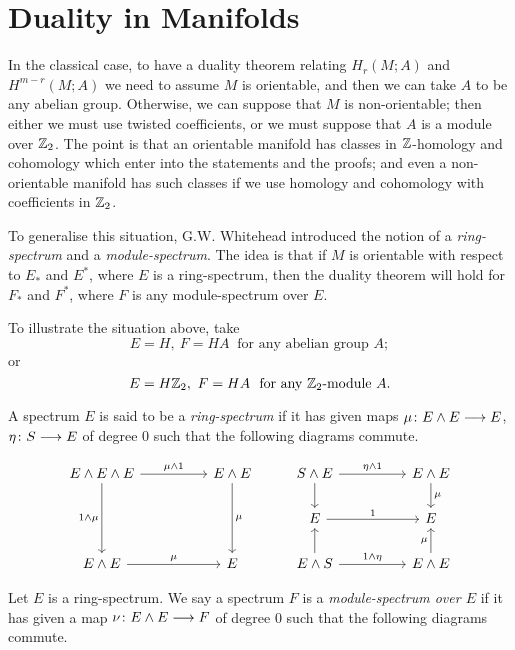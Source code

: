 \documentclass[../main]{subfiles}
\begin{document}
\chapter{Duality in Manifolds}
\label{sec:p3c10}
In the classical case, to have a duality theorem relating $H_r(M;A)$ and $H^{m-r}(M;A)$ we need to assume $M$ is orientable, and then we can take $A$ to be any abelian group. Otherwise, we can suppose that $M$ is non-orientable; then either we must use twisted coefficients, or we must suppose that $A$ is a module over $\mathbb{Z}_2$. The point is that an orientable manifold has classes in $\mathbb{Z}$-homology and cohomology which enter into the statements and the proofs; and even a non-orientable manifold has such classes if we use homology and cohomology with coefficients in $\mathbb{Z}_2$. 

To generalise this situation, G.W. Whitehead introduced the notion of a \emph{ring-spectrum} and a \emph{module-spectrum}. The idea is that if $M$ is orientable with respect to $E_*$ and $E^*$, where $E$ is a ring-spectrum, then the duality theorem will hold for $F_*$ and $F^*$, where $F$ is any module-spectrum over $E$.
\begin{examples}
To illustrate the situation above, take
\[E=H, \ F=HA \ \text{ for any abelian group } A;\]
or
\[E = H\mathbb{Z}_2, \ F=HA \ \text{ for any $\mathbb{Z}_2$-module } A.\]
\end{examples}

A spectrum $E$ is said to be a \emph{ring-spectrum} if it has given maps $\mu \colon E \wedge E \longrightarrow E$, $\eta \colon S \longrightarrow E$ of degree 0 such that the following diagrams commute.


\[
\begin{tikzcd}
E \wedge E \wedge E \arrow[dd, "1 \wedge \mu"'] \arrow[rr, "\mu \wedge 1"] &  & E \wedge E \arrow[dd, "\mu"] & S \wedge E \arrow[rr, "\eta \wedge 1"] \arrow[d] &  & E \wedge E \arrow[d, "\mu"] \\
                                                                           &  &                              & E \arrow[rr, "1"]                                &  & E                           \\
E \wedge E \arrow[rr, "\mu"]                                               &  & E                            & E \wedge S \arrow[rr, "1 \wedge \eta"] \arrow[u] &  & E \wedge E \arrow[u, "\mu"]
\end{tikzcd}
\]

Let $E$ is a ring-spectrum. We say a spectrum $F$ is a \emph{module-spectrum over $E$} if it has given a map $\nu \colon E \wedge E \longrightarrow F$ of degree 0 such that the following diagrams commute.
\end{document}

